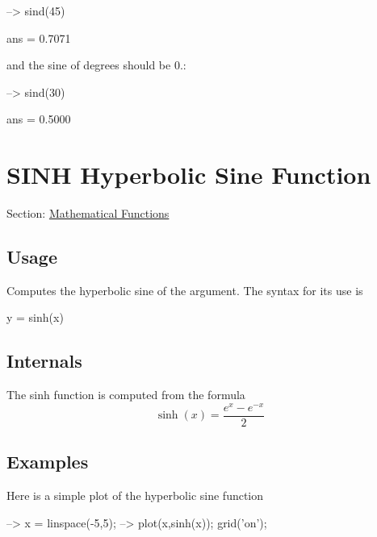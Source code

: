 \begin{DoxyVerbInclude}
--> sind(45)

ans = 
    0.7071 
\end{DoxyVerbInclude}


and the sine of {} degrees should be 0.\-:


\begin{DoxyVerbInclude}
--> sind(30)

ans = 
    0.5000 
\end{DoxyVerbInclude}
 \hypertarget{mathfunctions_sinh}{}\section{S\-I\-N\-H Hyperbolic Sine Function}\label{mathfunctions_sinh}
Section\-: \hyperlink{sec_mathfunctions}{Mathematical Functions} \hypertarget{vtkwidgets_vtkxyplotwidget_Usage}{}\subsection{Usage}\label{vtkwidgets_vtkxyplotwidget_Usage}
Computes the hyperbolic sine of the argument. The syntax for its use is \begin{DoxyVerb}   y = sinh(x)
\end{DoxyVerb}
 \hypertarget{transforms_svd_Function}{}\subsection{Internals}\label{transforms_svd_Function}
The {\ttfamily sinh} function is computed from the formula \[ \sinh(x) = \frac{e^x-e^{-x}}{2} \] \hypertarget{variables_matrix_Examples}{}\subsection{Examples}\label{variables_matrix_Examples}
Here is a simple plot of the hyperbolic sine function


\begin{DoxyVerbInclude}
--> x = linspace(-5,5);
--> plot(x,sinh(x)); grid('on');
\end{DoxyVerbInclude}


